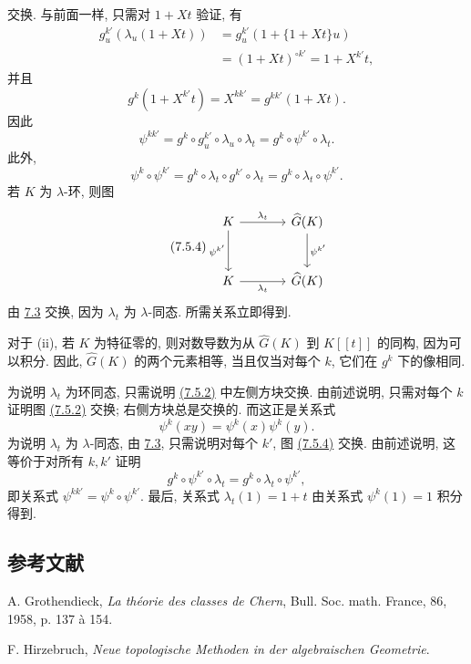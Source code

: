 交换. 与前面一样, 只需对 \(1+Xt\) 验证, 有
\[
 \begin{aligned}
 g^{k'}_u(\lambda_u(1+Xt))
 &=g^{k'}_u(1+\{1+Xt\}u)\\
 &=(1+Xt)^{\circ k'}=1+X^{k'}t,
 \end{aligned}
\]
并且
\[
 g^k(1+X^{k'}t)=X^{kk'}=g^{kk'}(1+Xt).
\]
因此
\[
 \psi^{kk'}=g^k\circ g^{k'}_u\circ\lambda_u\circ\lambda_t
           =g^k\circ\psi^{k'}\circ\lambda_t.
\]
此外,
\[
 \psi^k\circ\psi^{k'}
 =g^k\circ\lambda_t\circ g^{k'}\circ\lambda_t
 =g^k\circ\lambda_t\circ\psi^{k'}.
\]
若 \(K\) 为 \(\lambda\)-环, 则图
\begin{equation}\tag{7.5.4}
\begin{tikzcd}[column sep=large,row sep=large]
K \arrow[r,"\lambda_t"] \arrow[d,"\psi^{k'}"'] &
\widehat G(K) \arrow[d,"\psi^{k'}"]\\
K \arrow[r,"\lambda_t"'] &
\widehat G(K)
\end{tikzcd}
\end{equation}
由 \hyperlink{sga6.e05.para.7-3}{7.3} 交换, 因为 \(\lambda_t\) 为 \(\lambda\)-同态. 所需关系立即得到.

对于 (ii), 若 \(K\) 为特征零的, 则对数导数为从 \(\widehat G(K)\) 到 \(K[[t]]\) 的同构, 因为可以积分. 因此, \(\widehat G(K)\) 的两个元素相等, 当且仅当对每个 \(k\), 它们在 \(g^k\) 下的像相同.

为说明 \(\lambda_t\) 为环同态, 只需说明 \hyperlink{sga6.e05.eq.7-5-2}{(7.5.2)} 中左侧方块交换. 由前述说明, 只需对每个 \(k\) 证明图 \hyperlink{sga6.e05.eq.7-5-2}{(7.5.2)} 交换; 右侧方块总是交换的. 而这正是关系式
\[
  \psi^k(xy)=\psi^k(x)\psi^k(y).
\]
为说明 \(\lambda_t\) 为 \(\lambda\)-同态, 由 \hyperlink{sga6.e05.para.7-3}{7.3}, 只需说明对每个 \(k'\), 图 \hyperlink{sga6.e05.eq.7-5-4}{(7.5.4)} 交换. 由前述说明, 这等价于对所有 \(k,k'\) 证明
\[
  g^k\circ\psi^{k'}\circ\lambda_t
  =
  g^k\circ\lambda_t\circ\psi^{k'},
\]
即关系式 \(\psi^{kk'}=\psi^k\circ\psi^{k'}\). 最后, 关系式 \(\lambda_t(1)=1+t\) 由关系式 \(\psi^k(1)=1\) 积分得到.

\subsection*{参考文献}
\begin{enumerate}[label={[\arabic*]}]
\item A. Grothendieck, \emph{La théorie des classes de Chern}, Bull. Soc. math. France, 86, 1958, p. 137 à 154.
\item F. Hirzebruch, \emph{Neue topologische Methoden in der algebraischen Geometrie}.
\end{enumerate}



